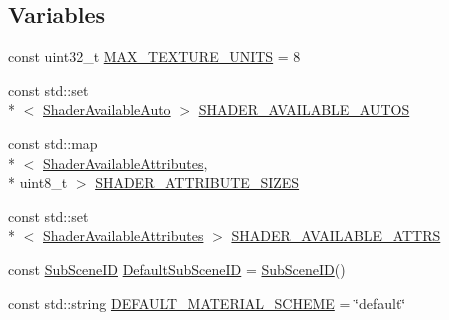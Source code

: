 \subsection*{Variables}
\begin{DoxyCompactItemize}
\item 
const uint32\-\_\-t \hyperlink{namespacekglt_a3930162bdae8bd51f75beb7f29a20b5b}{M\-A\-X\-\_\-\-T\-E\-X\-T\-U\-R\-E\-\_\-\-U\-N\-I\-T\-S} = 8
\item 
const std\-::set\\*
$<$ \hyperlink{namespacekglt_a3c56a1c7ebb2407f24d77a71c2eaa347}{Shader\-Available\-Auto} $>$ \hyperlink{namespacekglt_a609c90644c4f40d0819f5ad8bab2ca3a}{S\-H\-A\-D\-E\-R\-\_\-\-A\-V\-A\-I\-L\-A\-B\-L\-E\-\_\-\-A\-U\-T\-O\-S}
\item 
const std\-::map\\*
$<$ \hyperlink{namespacekglt_a402d09e4a0c30dbb100d563c0a3d945a}{Shader\-Available\-Attributes}, \\*
uint8\-\_\-t $>$ \hyperlink{namespacekglt_a25e5aa4661ffc838eec14145482e6d58}{S\-H\-A\-D\-E\-R\-\_\-\-A\-T\-T\-R\-I\-B\-U\-T\-E\-\_\-\-S\-I\-Z\-E\-S}
\item 
const std\-::set\\*
$<$ \hyperlink{namespacekglt_a402d09e4a0c30dbb100d563c0a3d945a}{Shader\-Available\-Attributes} $>$ \hyperlink{namespacekglt_a3de57ba7765380c9a02def24525203db}{S\-H\-A\-D\-E\-R\-\_\-\-A\-V\-A\-I\-L\-A\-B\-L\-E\-\_\-\-A\-T\-T\-R\-S}
\item 
const \hyperlink{namespacekglt_a36b738e02745f47c81d1c9991fdc6237}{Sub\-Scene\-I\-D} \hyperlink{namespacekglt_a1559a1d838d31d63178aee0545ea70ea}{Default\-Sub\-Scene\-I\-D} = \hyperlink{namespacekglt_a36b738e02745f47c81d1c9991fdc6237}{Sub\-Scene\-I\-D}()
\item 
const std\-::string \hyperlink{namespacekglt_a38d05dbff502b115008d20ebdfd77a44}{D\-E\-F\-A\-U\-L\-T\-\_\-\-M\-A\-T\-E\-R\-I\-A\-L\-\_\-\-S\-C\-H\-E\-M\-E} = \char`\"{}default\char`\"{}
\end{DoxyCompactItemize}


